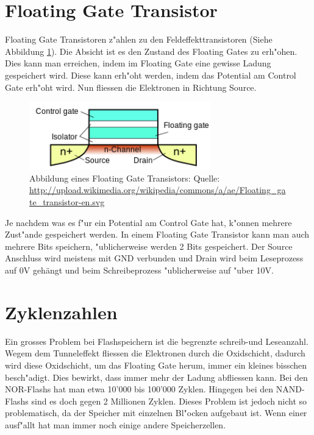 \begin{refsection}
\section{Floating Gate Transistor}
Floating Gate Transistoren z"ahlen zu den Feldeffekttransistoren
(Siehe Abbildung \ref{skript:Floatinggatetransistor}). Die Absicht ist
es den Zustand des Floating Gates zu erh"ohen. Dies kann man erreichen,
indem im Floating Gate eine gewisse Ladung gespeichert wird. Diese kann
erh"oht werden, indem das Potential am Control Gate erh"oht wird. Nun
fliessen die Elektronen in Richtung Source.

\begin{figure}
\centering
\includegraphics[width=0.7\textwidth]{flash/graphics/Floatinggate.png}
\caption{Abbildung eines Floating Gate Transistors: Quelle:
\url{http://upload.wikimedia.org/wikipedia/commons/a/ae/Floating_gate_transistor-en.svg}
\label{skript:Floatinggatetransistor}}
\end{figure}

Je nachdem was es f"ur ein Potential am Control Gate hat, k"onnen mehrere
Zust"ande gespeichert werden. In einem Floating Gate Transistor kann
man auch mehrere Bits speichern, "ublicherweise werden 2 Bits gespeichert.
Der Source Anschluss wird meistens mit GND verbunden und Drain wird beim
Leseprozess auf 0V gehängt und beim Schreibeprozess "ublicherweise auf
"uber 10V.

\section{Zyklenzahlen}
Ein grosses Problem bei Flashspeichern ist die begrenzte schreib-und
Leseanzahl. Wegem dem Tunneleffekt fliessen die Elektronen durch die
Oxidschicht, dadurch wird diese Oxidschicht, um das Floating Gate herum,
immer ein kleines bisschen besch"adigt. Dies bewirkt, dass immer mehr
der Ladung abfliessen kann. Bei den NOR-Flashs hat man etwa 10'000
bis 100'000 Zyklen. Hingegen bei den NAND-Flashs sind es doch gegen 2
Millionen Zyklen. Dieses Problem ist jedoch nicht so problematisch, da
der Speicher mit einzelnen Bl"ocken aufgebaut ist. Wenn einer ausf"allt
hat man immer noch einige andere Speicherzellen.


\end{refsection}
